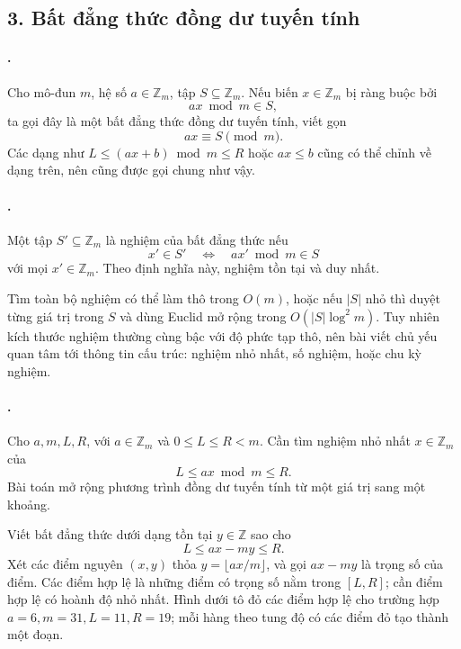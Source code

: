 \documentclass[11pt]{article}
\begin{document}
\subsection*{3. Bất đẳng thức đồng dư tuyến tính}

\paragraph{.}
Cho mô-đun \(m\), hệ số \(a\in\mathbb Z_m\), tập \(S\subseteq\mathbb Z_m\).
Nếu biến \(x\in\mathbb Z_m\) bị ràng buộc bởi
\[
  ax\bmod m\in S,
\]
ta gọi đây là một bất đẳng thức đồng dư tuyến tính, viết gọn
\[
  ax\equiv S\pmod m.
\]
Các dạng như \(L\le (ax+b)\bmod m\le R\) hoặc \(ax\le b\) cũng có thể chỉnh
về dạng trên, nên cũng được gọi chung như vậy.

\paragraph{.}
Một tập \(S'\subseteq\mathbb Z_m\) là nghiệm của bất đẳng thức nếu
\[
  x'\in S'\quad\Longleftrightarrow\quad ax'\bmod m\in S
\]
với mọi \(x'\in\mathbb Z_m\). Theo định nghĩa này, nghiệm tồn tại và duy nhất.

Tìm toàn bộ nghiệm có thể làm thô trong \(O(m)\), hoặc nếu \(|S|\) nhỏ thì
duyệt từng giá trị trong \(S\) và dùng Euclid mở rộng trong \(O(|S|\log^2 m)\).
Tuy nhiên kích thước nghiệm thường cùng bậc với độ phức tạp thô, nên bài viết
chủ yếu quan tâm tới thông tin cấu trúc: nghiệm nhỏ nhất, số nghiệm, hoặc chu
kỳ nghiệm.

\paragraph{.}
Cho \(a,m,L,R\), với \(a\in\mathbb Z_m\) và \(0\le L\le R<m\). Cần tìm nghiệm
nhỏ nhất \(x\in\mathbb Z_m\) của
\[
  L\le ax\bmod m\le R.
\]
Bài toán mở rộng phương trình đồng dư tuyến tính từ một giá trị sang một
khoảng.

Viết bất đẳng thức dưới dạng tồn tại \(y\in\mathbb Z\) sao cho
\[
  L\le ax-my\le R.
\]
Xét các điểm nguyên \((x,y)\) thỏa \(y=\lfloor ax/m\rfloor\), và gọi
\(ax-my\) là trọng số của điểm. Các điểm hợp lệ là những điểm có trọng số nằm
trong \([L,R]\); cần điểm hợp lệ có hoành độ nhỏ nhất. Hình dưới tô đỏ các điểm
hợp lệ cho trường hợp \(a=6,m=31,L=11,R=19\); mỗi hàng theo tung độ có các điểm
đỏ tạo thành một đoạn.

\begin{center}
\end{center}
\end{document}
